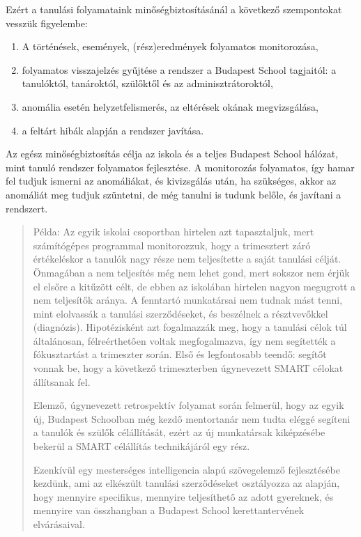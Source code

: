 Ezért a tanulási folyamataink minőségbiztosításánál a következő szempontokat vesszük figyelembe:
\begin{enumerate}
\item  A történések, események, (rész)eredmények folyamatos monitorozása,
\item folyamatos visszajelzés gyűjtése a rendszer a Budapest School tagjaitól: a tanulóktól, tanároktól, szülőktől és az adminisztrátoroktól,
\item anomália esetén helyzetfelismerés, az eltérések okának megvizsgálása,
\item a feltárt hibák alapján a rendszer javítása.
\end{enumerate}

Az egész minőségbiztosítás célja az iskola és a teljes  Budapest School hálózat, mint tanuló rendszer folyamatos fejlesztése. A monitorozás folyamatos, így hamar fel tudjuk ismerni az anomáliákat, és kivizsgálás után, ha szükséges, akkor az anomáliát meg tudjuk szüntetni, de még tanulni is tudunk belőle, és javítani a rendszert.
\begin{quote}
Példa: Az egyik iskolai csoportban hirtelen azt tapasztaljuk, mert számítógépes programmal monitorozzuk, hogy a trimesztert záró értékeléskor a tanulók nagy része nem teljesítette a saját tanulási célját. Önmagában a nem teljesítés még nem lehet gond, mert sokszor nem érjük el elsőre a kitűzött célt, de ebben az iskolában hirtelen nagyon megugrott a nem teljesítők aránya. A fenntartó munkatársai nem tudnak mást tenni, mint elolvassák a tanulási szerződéseket, és beszélnek a résztvevőkkel (diagnózis). Hipotézisként azt fogalmazzák meg, hogy a tanulási célok túl általánosan, félreérthetően voltak megfogalmazva, így nem segítették a fókusztartást a trimeszter során. Első és legfontosabb teendő: segítőt vonnak be, hogy a következő trimeszterben úgynevezett SMART\cite{wiki:smart} célokat állítsanak fel.

Elemző, úgynevezett retrospektív folyamat során felmerül, hogy az egyik új, Budapest Schoolban még kezdő mentortanár nem tudta eléggé segíteni a tanulók és szülők célállítását, ezért az új munkatársak kiképzésébe bekerül a SMART célállítás technikájáról egy rész.

Ezenkívül egy mesterséges intelligencia alapú szövegelemző fejlesztésébe kezdünk, ami az elkészült tanulási szerződéseket osztályozza az alapján, hogy mennyire specifikus, mennyire teljesíthető az adott gyereknek, és mennyire van összhangban a Budapest School kerettantervének elvárásaival.
\end{quote}




